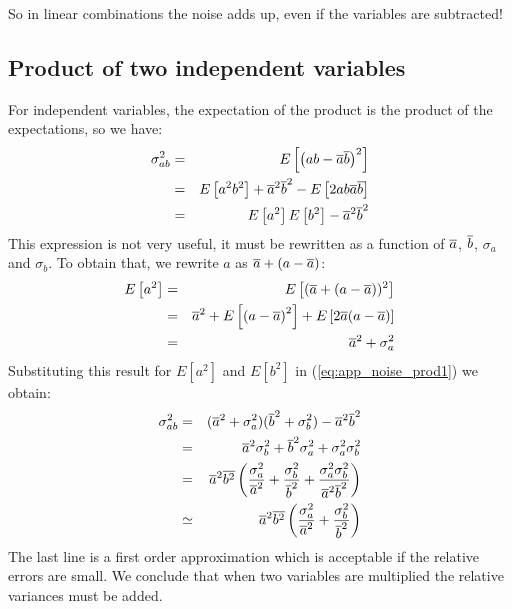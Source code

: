 So in linear combinations the noise adds up, even
if the variables are subtracted!

\subsection{Product of two independent variables}
For independent variables, the expectation of the product is the
product of the expectations, so we have:
\begin{eqnarray}
 \sigma_{ab}^2 & = & E\left[{\left( ab - \overline{a} \overline{b}\right)^2}\right] \nonumber\\
  & = & E\left[{a^2b^2}\right] + \overline{a}^2\overline{b}^2 - E\left[{2 a b \overline{a} \overline{b}}\right] \nonumber\\
  & = & E\left[{a^2}\right] E\left[{b^2}\right] - \overline{a}^2 \overline{b}^2 \label{eq:app_noise_prod1}
\end{eqnarray}
This expression is not very useful, it must be rewritten as a function of
$\overline{a}$, $\overline{b}$, $\sigma_a$ and $\sigma_b$. To obtain that, we rewrite $a$
as $\overline{a} + (a - \overline{a})$:
\begin{eqnarray}
  E\left[{a^2}\right] & = & E\left[{(\overline{a} + (a - \overline{a}))^2}\right] \nonumber\\
 & = & \overline{a}^2 + E\left[{\left( a - \overline{a} \right)^2}\right] + E\left[{2 \overline{a}(a - \overline{a})}\right]
       \nonumber\\
 & = & \overline{a}^2 + \sigma_a^2
\end{eqnarray}
Substituting this result for $E[a^2]$ and $E[b^2]$ in
(\ref{eq:app_noise_prod1}) we obtain:
\begin{eqnarray}
\sigma_{ab}^2 & = & (\overline{a}^2 + \sigma_a^2)(\overline{b}^2 + \sigma_b^2) 
                     - \overline{a}^2 \overline{b}^2 \nonumber\\
 & = & \overline{a}^2\sigma_b^2 + \overline{b}^2\sigma_a^2 + \sigma_a^2 \sigma_b^2
        \nonumber\\
 & = & \overline{a}^2\overline{b^2}\left( \frac{\sigma_a^2}{\overline{a}^2} + 
       \frac{\sigma_b^2}{\overline{b}^2} 
     + \frac{\sigma_a^2\sigma_b^2}{\overline{a}^2\overline{b}^2}\right)\\
 & \simeq & \overline{a}^2\overline{b^2}\left( \frac{\sigma_a^2}{\overline{a}^2} + 
       \frac{\sigma_b^2}{\overline{b}^2}\right)
\end{eqnarray}
The last line is a first order approximation which is acceptable if the
relative errors are small. We conclude that when two variables are multiplied
the relative variances must be added. 


